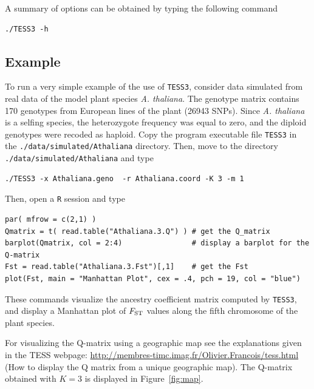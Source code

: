 \documentclass[12pt,a4paper]{article}
\begin{document}
\begin{itemize}
\end{itemize}


\noindent A summary of options can be obtained  by typing the following command
\footnotesize
\begin{Verbatim}[frame=single]
./TESS3 -h
\end{Verbatim}
\noindent
\normalsize


\subsection{Example}\label{sec:ex}

To run a very simple example of the use of {\tt TESS3}, consider data simulated 
from real data of the model plant species {\it A. thaliana}. The genotype 
matrix contains 170 genotypes from European lines of the plant (26943 SNPs). 
Since {\it A. thaliana} is a selfing species, the heterozygote frequency was 
equal to zero, and the diploid genotypes were recoded as haploid. Copy the 
program executable file {\tt TESS3} in the {\tt ./data/simulated/Athaliana} directory. Then, move to 
the directory {\tt ./data/simulated/Athaliana} and type 

\begin{Verbatim}[frame=single]
./TESS3 -x Athaliana.geno  -r Athaliana.coord -K 3 -m 1
\end{Verbatim}

\noindent Then, open a {\tt R} session and type


\begin{Verbatim}[frame=single]
par( mfrow = c(2,1) )
Qmatrix = t( read.table("Athaliana.3.Q") ) # get the Q_matrix
barplot(Qmatrix, col = 2:4)                # display a barplot for the Q-matrix
Fst = read.table("Athaliana.3.Fst")[,1]    # get the Fst
plot(Fst, main = "Manhattan Plot", cex = .4, pch = 19, col = "blue")
\end{Verbatim}

These commands visualize the ancestry coefficient matrix computed by {\tt TESS3}, 
and display a Manhattan plot of $F_{\rm ST}$ values along the fifth chromosome 
of the plant species.

For visualizing the Q-matrix using a geographic map see the explanations given in the TESS webpage: 
\url{http://membres-timc.imag.fr/Olivier.Francois/tess.html} (How to display the Q matrix from a unique geographic map).  
The Q-matrix obtained with $K=3$ is displayed in Figure~\ref{fig:map}. 
\end{document}

